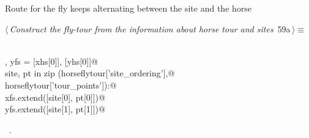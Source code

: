 \documentclass[11.5pt]{report}
\begin{document}
\vspace{-0.8cm} \newchunk Route for the fly  keeps alternating between the site and the horse
\begin{flushleft} \small
\begin{minipage}{\linewidth}\label{scrap86}\raggedright\small
{} $\langle\,${\itshape Construct the fly-tour from the information about horse tour and sites}\nobreak\ {\footnotesize {59a}}$\,\rangle\equiv$
\vspace{-1ex}
\begin{list}{}{} \item
\mbox{}\verb@@\\
\mbox{}\verb@xfs , yfs = [xhs[0]], [yhs[0]]@\\
\mbox{}\verb@for site, pt in zip (horseflytour['site_ordering'],@\\
\mbox{}\verb@                     horseflytour['tour_points']):@\\
\mbox{}\verb@   xfs.extend([site[0], pt[0]])@\\
\mbox{}\verb@   yfs.extend([site[1], pt[1]])@\\
\mbox{}\verb@@{\NWsep}
\end{list}
\vspace{-1.5ex}
\footnotesize
\begin{list}{}{\setlength{\itemsep}{-\parsep}\setlength{\itemindent}{-\leftmargin}}
\item \NWtxtMacroRefIn\ .

\item{}
\end{list}
\end{minipage}\vspace{4ex}
\end{flushleft}
\end{document}

